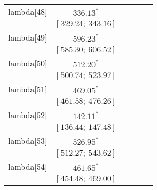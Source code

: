 \begin{table}
\begin{center}
\begin{tabular}{l c c c c c }
lambda[48]  & $336.13^{*}$                     &                           &                           &                         &                         \\
            & $[329.24;\ 343.16]$              &                           &                           &                         &                         \\
lambda[49]  & $596.23^{*}$                     &                           &                           &                         &                         \\
            & $[585.30;\ 606.52]$              &                           &                           &                         &                         \\
lambda[50]  & $512.20^{*}$                     &                           &                           &                         &                         \\
            & $[500.74;\ 523.97]$              &                           &                           &                         &                         \\
lambda[51]  & $469.05^{*}$                     &                           &                           &                         &                         \\
            & $[461.58;\ 476.26]$              &                           &                           &                         &                         \\
lambda[52]  & $142.11^{*}$                     &                           &                           &                         &                         \\
            & $[136.44;\ 147.48]$              &                           &                           &                         &                         \\
lambda[53]  & $526.95^{*}$                     &                           &                           &                         &                         \\
            & $[512.27;\ 543.62]$              &                           &                           &                         &                         \\
lambda[54]  & $461.65^{*}$                     &                           &                           &                         &                         \\
            & $[454.48;\ 469.00]$              &                           &                           &                         &                         \\

\end{tabular}
\end{center}
\end{table}
